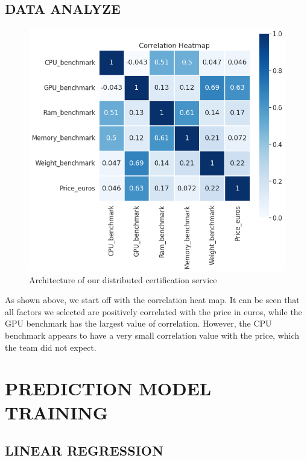 \documentclass{scrartcl}
\begin{document}
\subsection{DATA ANALYZE}

\begin{figure}[H]
	\begin{center}
		\includegraphics[scale=0.4]{Graphics/4520 final/Heat_map.png}
	\end{center}
	\caption{Architecture of our distributed certification service}
	\label{fig:heat}
\end{figure}

As shown above, we start off with the correlation heat map. It can be seen that all factors we selected are positively correlated with the price in euros, while the GPU benchmark has the largest value of correlation. However, the CPU benchmark appears to have a very small correlation value with the price, which the team did not expect. 

\section{PREDICTION MODEL TRAINING}

\subsection{LINEAR REGRESSION}
\end{document}
